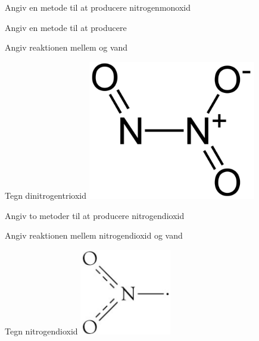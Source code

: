 \begin{flashcard}[Reaktion]{Angiv en metode til at producere nitrogenmonoxid}
\end{flashcard}

\begin{flashcard}[Reaktion]{Angiv en metode til at producere }
\end{flashcard}

\begin{flashcard}[Reaktion]{Angiv reaktionen mellem  og vand}
\end{flashcard}

\begin{flashcard}[Struktur]{Tegn dinitrogentrioxid}
\includegraphics[width=0.55\textwidth]{figures/Dinitrogentrioxid.png}
\end{flashcard}

\begin{flashcard}[Reaktion]{Angiv to metoder til at producere nitrogendioxid}
\\ \vspace{7pt}
\end{flashcard}

\begin{flashcard}[Reaktion]{Angiv reaktionen mellem nitrogendioxid og vand}
\end{flashcard}

\begin{flashcard}[Struktur]{Tegn nitrogendioxid}
\includegraphics[width=0.3\textwidth]{figures/k15s383Nitrogendioxid.png}
\end{flashcard}


